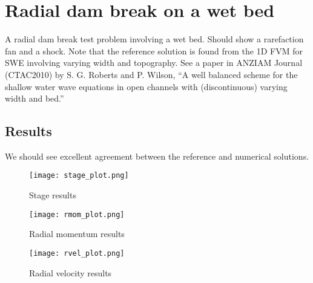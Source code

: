 
\section{Radial dam break on a wet bed}

A radial dam break test problem involving a wet bed. Should show a rarefaction fan and a shock. Note that the reference solution is found from the 1D FVM for SWE involving varying width and topography. See a paper in ANZIAM Journal (CTAC2010) by S. G. Roberts and P. Wilson, ``A well balanced scheme for the shallow water wave equations in open channels with (discontinuous) varying width and bed.''


\subsection{Results}

We should see excellent agreement between the reference and numerical solutions.

\begin{figure}[h]
\begin{center}
\texttt{[image: stage\_plot.png]}
\end{center}
\caption{Stage results}
\end{figure}


\begin{figure}[h]
\begin{center}
\texttt{[image: rmom\_plot.png]}
\end{center}
\caption{Radial momentum results}
\end{figure}


\begin{figure}[h]
\begin{center}
\texttt{[image: rvel\_plot.png]}
\end{center}
\caption{Radial velocity results}
\end{figure}


\endinput
